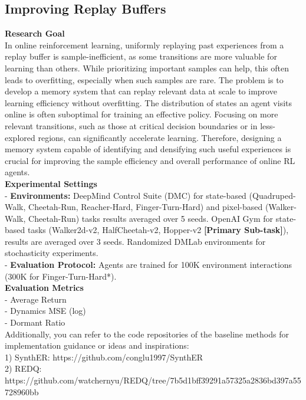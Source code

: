 \documentclass[11pt]{article}
\theoremstyle{plain}
\theoremstyle{definition}
\theoremstyle{remark}
\begin{document}
\newpage
\subsection{Improving Replay Buffers} \label{app:tasks-irb}

\begin{tcolorbox}[
    colback=white,
    colframe=myPastelGreen,
    title=\textbf{\textcolor{black}{Task Description}},
    boxrule=0.5mm,
    width=\linewidth,
    arc=2mm,
    boxsep=5pt,
    left=6pt, right=6pt, top=6pt, bottom=6pt,
][ht]

\textbf{Research Goal}\\
In online reinforcement learning, uniformly replaying past experiences from a replay buffer is sample-inefficient, as some transitions are more valuable for learning than others. While prioritizing important samples can help, this often leads to overfitting, especially when such samples are rare. The problem is to develop a memory system that can replay relevant data at scale to improve learning efficiency without overfitting. The distribution of states an agent visits online is often suboptimal for training an effective policy. Focusing on more relevant transitions, such as those at critical decision boundaries or in less-explored regions, can significantly accelerate learning. Therefore, designing a memory system capable of identifying and densifying such useful experiences is crucial for improving the sample efficiency and overall performance of online RL agents.\\

\textbf{Experimental Settings}\\
- \textbf{Environments:} DeepMind Control Suite (DMC) for state-based (Quadruped-Walk, Cheetah-Run, Reacher-Hard, Finger-Turn-Hard) and pixel-based (Walker-Walk, Cheetah-Run) tasks results averaged over 5 seeds. OpenAI Gym for state-based tasks (Walker2d-v2, HalfCheetah-v2, Hopper-v2 \textbf{[Primary Sub-task]}), results are averaged over 3 seeds. Randomized DMLab environments for stochasticity experiments.\\
- \textbf{Evaluation Protocol:} Agents are trained for 100K environment interactions (300K for Finger-Turn-Hard*).\\

\textbf{Evaluation Metrics}\\
- Average Return\\
- Dynamics MSE (log)\\
- Dormant Ratio\\

Additionally, you can refer to the code repositories of the baseline methods for implementation guidance or ideas and inspirations:\\
1) SynthER: https://github.com/conglu1997/SynthER\\
2) REDQ: https://github.com/watchernyu/REDQ/tree/7b5d1bff39291a57325a2836bd397a55728960bb

\end{tcolorbox}
\end{document}

